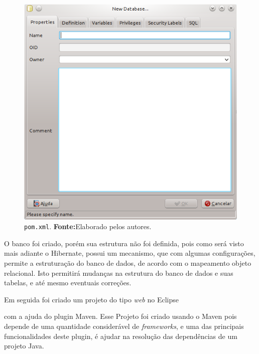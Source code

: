 	\begin{figure}[h!]
		\centerline{\includegraphics[scale=1]{./imagens/2_q_metodologico/4_procedimentos_resultados/43_webservice/432_desenvolvimento/desws1.png}}
		\caption[\texttt{pom.xml}]{\texttt{pom.xml}.
			\textbf{Fonte:}Elaborado pelos autores.}
		\label{fig:desws1}
	\end{figure}

	\par O banco foi criado, porém sua estrutura não foi definida, pois como será
visto mais adiante o Hibernate, possui um mecanismo, que com algumas
configurações, permite a estruturação do banco de dados, de acordo com o
mapeamento objeto relacional. Isto permitirá mudanças na estrutura do banco de
dados e suas tabelas, e até mesmo eventuais correções.


	\par Em seguida foi criado um projeto do tipo \textit{web} no Eclipse
 

	\par com a ajuda do plugin Maven. Esse Projeto foi criado usando o
Maven pois depende de uma quantidade considerável de \textit{frameworks}, e uma das
principais funcionalidades deste plugin, é ajudar na resolução das dependências
de um projeto Java.

